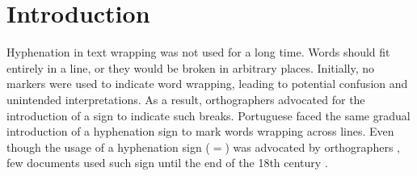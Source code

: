 \documentclass{article}
\begin{document}






\begin{abstract}
    Portuguese hyphenation rules are available for more than 35
    years and have done a good job. Nonetheless they still make mistakes and
    leave some hyphenation points unmarked. Although most undetected
    hyphenation points are located near word boundaries, what will be
    irrelevant for \TeX{} typographic purposes, they are still useful to
    hyphenate proper nouns, new words or pseudoword, and for usage in other
    applications, such as text-to-speech conversion. A list of
    \num{\DictionarySize} hyphenated words acquired from online dictionaries was
    used along \emph{patgen} to create improved rules, leading to better hyphenation
    of Portuguese words.
\end{abstract}

\section{Introduction}\label{sec-intro}

Hyphenation in text wrapping was not used for a long time. Words should fit
entirely in a line, or they would be broken in arbitrary places.  Initially, no
markers were used to indicate word wrapping, leading to potential confusion and
unintended interpretations. As a result, orthographers advocated for the
introduction of a sign to indicate such breaks. Portuguese faced the same
gradual introduction of a hyphenation sign to mark words wrapping across lines.
Even though the usage of a hyphenation sign ($=$) was advocated by
orthographers \parencite{gandavo1574}, few documents used such sign until the end of
the 18th century \parencite{araujo2015}.
\end{document}
